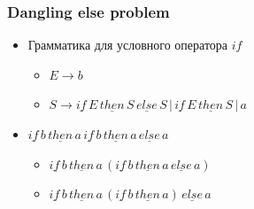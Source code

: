 \documentclass{beamer}
\begin{document}
\begin{frame}[fragile]
  \transwipe[direction=90]
  \frametitle{Dangling else problem}
  \begin{itemize}
    \item Грамматика для условного оператора $if$
    \begin{itemize}
      \item $E \rightarrow b $
      \item $S \rightarrow \underline{if} \, E \, \underline{then} \, S \, \underline{else} \, S \, | \, \underline{if} \, E \, \underline{then} \, S \, | \, a$    
    \end{itemize}
    
    \item $\underline{if} \, b \, \underline{then} \, a  \, \underline{if} \, b \, \underline{then} \, a \, \underline{else} \, a$ \pause
    \begin{itemize}
      \item $\underline{if} \, b \, \underline{then} \, a  \, (\underline{if} \, b \, \underline{then} \, a \, \underline{else} \, a)$
      \item $\underline{if} \, b \, \underline{then} \, a  \, (\underline{if} \, b \, \underline{then} \, a) \, \underline{else} \, a$
    \end{itemize}
  \end{itemize}
\end{frame}
\end{document}
